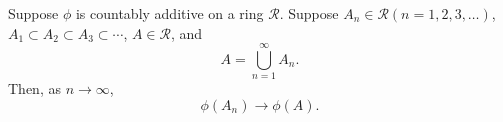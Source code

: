 \begin{thm}
    \label{thm:11.3}
    Suppose $\phi$ is countably additive on a ring $\mathscr{R}$.
    Suppose $A_n \in \mathscr{R} (n = 1,2,3,\dots)$,
    $A_1 \subset A_2 \subset A_3 \subset \cdots$, $A \in \mathscr{R}$, and
    \begin{equation*}
        A = \bigcup_{n=1}^{\infty} A_n .
    \end{equation*}
    Then, as $n \rightarrow \infty$,
    \begin{equation*}
        \phi(A_n) \rightarrow \phi(A) .
    \end{equation*}
\end{thm}

